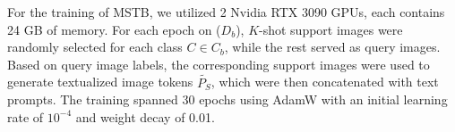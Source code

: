 \documentclass[10pt,twocolumn,letterpaper]{article}
\begin{document}
For the training of MSTB, we utilized 2 Nvidia RTX 3090 GPUs, each contains 24 GB of memory. For each epoch on ($D_b$), $K$-shot support images were randomly selected for each class $C \in C_b$, while the rest served as query images. Based on query image labels, the corresponding support images were used to generate textualized image tokens $\widetilde{P_S}$, which were then concatenated with text prompts. The training spanned 30 epochs using AdamW with an initial learning rate of $10^{-4}$ and weight decay of 0.01. %
\end{document}
